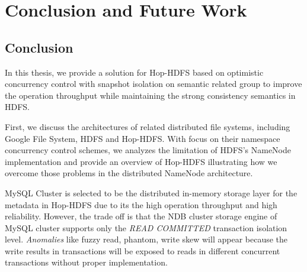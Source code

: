 
%
%


\chapter{Conclusion and Future Work}
\label{ch:conclusion}

%




\section{Conclusion}

In this thesis, we provide a solution for Hop-HDFS based on optimistic concurrency control with snapshot isolation on semantic related group to improve the operation throughput while maintaining the strong consistency semantics in HDFS.

\noindent First, we discuss the architectures of related distributed file systems, including Google File System, HDFS and Hop-HDFS. With focus on their namespace concurrency control schemes, we analyzes the limitation of HDFS's NameNode implementation and provide an overview of Hop-HDFS illustrating how we overcome those problems in the distributed NameNode architecture.

\noindent MySQL Cluster is selected to be the distributed in-memory storage layer for the metadata in Hop-HDFS due to its the high operation throughput and high reliability. However, the trade off is that the NDB cluster storage engine of MySQL cluster supports only the \textit{READ COMMITTED} transaction isolation level. \textit{Anomalies} like fuzzy read, phantom, write skew will appear because the write results in transactions will be exposed to reads in different concurrent transactions without proper implementation.

